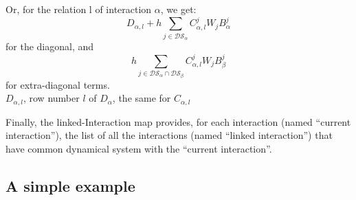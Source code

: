 \documentclass[10pt]{report}
\begin{document}
Or, for the relation l of interaction $\alpha$, we get: 
\begin{equation}
D_{\alpha,l}+h\sum_{j\in \mathcal{DS}_{\alpha}}C_{\alpha,l}^jW_jB_{\alpha}^j
\end{equation}
for the diagonal, and 
\begin{equation}
h\sum_{j\in \mathcal{DS}_{\alpha}\cap\mathcal{DS}_{\beta}}C_{\alpha,l}^jW_jB_{\beta}^j
\end{equation}
for extra-diagonal terms. \\
$D_{\alpha,l}$, row number $l$ of $D_{\alpha}$, the same for $C_{\alpha,l}$


Finally, the linked-Interaction map provides, for each interaction (named ``current interaction''), the list of all the interactions (named ``linked interaction'') that have common dynamical system with the ``current interaction''.
\subsection{A simple example}

\end{document}
